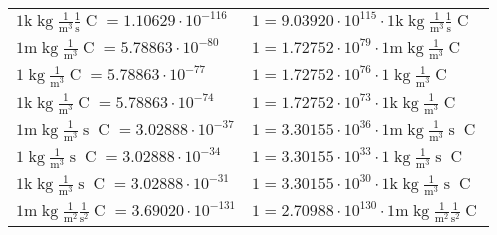 \begin{center}
\begin{longtable}{l l}
{\color{gray}$1 \bm{\mathrm{ k}}\operatorname{kg}\frac1{\operatorname{m}^3}\frac1{\operatorname{s}}{\operatorname{C}}{} = 1.10629\cdot10^{-116} $}   & {\color{gray}$ 1 = 9.03920\cdot10^{115} \cdot 1 \bm{\mathrm{ k}}\operatorname{kg}\frac1{\operatorname{m}^3}\frac1{\operatorname{s}}{\operatorname{C}}{}$}  \\
{\color{gray}$1 \bm{\mathrm{ m}}\operatorname{kg}\frac1{\operatorname{m}^3}{}{\operatorname{C}}{} = 5.78863\cdot10^{-80} $}   & {\color{gray}$ 1 = 1.72752\cdot10^{79} \cdot 1 \bm{\mathrm{ m}}\operatorname{kg}\frac1{\operatorname{m}^3}{}{\operatorname{C}}{}$}  \\
{\color{black}$1 \bm{\mathrm{ }}\operatorname{kg}\frac1{\operatorname{m}^3}{}{\operatorname{C}}{} = 5.78863\cdot10^{-77} $}   & {\color{black}$ 1 = 1.72752\cdot10^{76} \cdot 1 \bm{\mathrm{ }}\operatorname{kg}\frac1{\operatorname{m}^3}{}{\operatorname{C}}{}$}  \\
{\color{gray}$1 \bm{\mathrm{ k}}\operatorname{kg}\frac1{\operatorname{m}^3}{}{\operatorname{C}}{} = 5.78863\cdot10^{-74} $}   & {\color{gray}$ 1 = 1.72752\cdot10^{73} \cdot 1 \bm{\mathrm{ k}}\operatorname{kg}\frac1{\operatorname{m}^3}{}{\operatorname{C}}{}$}  \\
{\color{gray}$1 \bm{\mathrm{ m}}\operatorname{kg}\frac1{\operatorname{m}^3}{\operatorname{s}}{\operatorname{C}}{} = 3.02888\cdot10^{-37} $}   & {\color{gray}$ 1 = 3.30155\cdot10^{36} \cdot 1 \bm{\mathrm{ m}}\operatorname{kg}\frac1{\operatorname{m}^3}{\operatorname{s}}{\operatorname{C}}{}$}  \\
{\color{black}$1 \bm{\mathrm{ }}\operatorname{kg}\frac1{\operatorname{m}^3}{\operatorname{s}}{\operatorname{C}}{} = 3.02888\cdot10^{-34} $}   & {\color{black}$ 1 = 3.30155\cdot10^{33} \cdot 1 \bm{\mathrm{ }}\operatorname{kg}\frac1{\operatorname{m}^3}{\operatorname{s}}{\operatorname{C}}{}$}  \\
{\color{gray}$1 \bm{\mathrm{ k}}\operatorname{kg}\frac1{\operatorname{m}^3}{\operatorname{s}}{\operatorname{C}}{} = 3.02888\cdot10^{-31} $}   & {\color{gray}$ 1 = 3.30155\cdot10^{30} \cdot 1 \bm{\mathrm{ k}}\operatorname{kg}\frac1{\operatorname{m}^3}{\operatorname{s}}{\operatorname{C}}{}$}  \\
{\color{gray}$1 \bm{\mathrm{ m}}\operatorname{kg}\frac1{\operatorname{m}^2}\frac1{\operatorname{s}^2}{\operatorname{C}}{} = 3.69020\cdot10^{-131} $}   & {\color{gray}$ 1 = 2.70988\cdot10^{130} \cdot 1 \bm{\mathrm{ m}}\operatorname{kg}\frac1{\operatorname{m}^2}\frac1{\operatorname{s}^2}{\operatorname{C}}{}$}  \\

\end{longtable}
\end{center}
